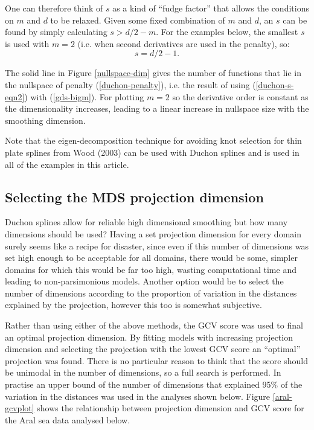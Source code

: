 \documentclass[useAMS, referee]{biom}
\begin{document}
One can therefore think of $s$ as a kind of ``fudge factor'' that allows the conditions on $m$ and $d$ to be relaxed. Given some fixed combination of $m$ and $d$, an $s$ can be found by simply calculating $s>d/2-m$. For the examples below, the smallest $s$ is used with $m=2$ (i.e. when second derivatives are used in the penalty), so:
\begin{equation}
s=d/2-1.
\label{duchon-s-eqn2}
\end{equation}

The solid line in Figure \ref{nullspace-dim} gives the number of functions that lie in the nullspace of penalty (\ref{duchon-penalty}), i.e. the result of using (\ref{duchon-s-eqn2}) with (\ref{gds-bigm}). For plotting $m=2$ so the derivative order is constant as the dimensionality increases, leading to a linear increase in nullspace size with the smoothing dimension.

Note that the eigen-decomposition technique for avoiding knot selection for thin plate splines from Wood (2003) can be used with Duchon splines and is used in all of the examples in this article.

\subsection{Selecting the MDS projection dimension}
\label{s:mdsdimselect}

Duchon splines allow for reliable high dimensional smoothing but how many dimensions should be used? Having a set projection dimension for every domain surely seems like a recipe for disaster, since even if this number of dimensions was set high enough to be acceptable for all domains, there would be some, simpler domains for which this would be far too high, wasting computational time and leading to non-parsimonious models. Another option would be to select the number of dimensions according to the proportion of variation in the distances explained by the projection, however this too is somewhat subjective.

Rather than using either of the above methods, the GCV score was used to final an optimal projection dimension. By fitting models with increasing projection dimension and selecting the projection with the lowest GCV score an ``optimal'' projection was found. There is no particular reason to think that the score should be unimodal in the number of dimensions, so a full search is performed. In practise an upper bound of the number of dimensions that explained 95\% of the variation in the distances was used in the analyses shown below. Figure \ref{aral-gcvplot} shows the relationship between projection dimension and GCV score for the Aral sea data analysed below.
\end{document}
